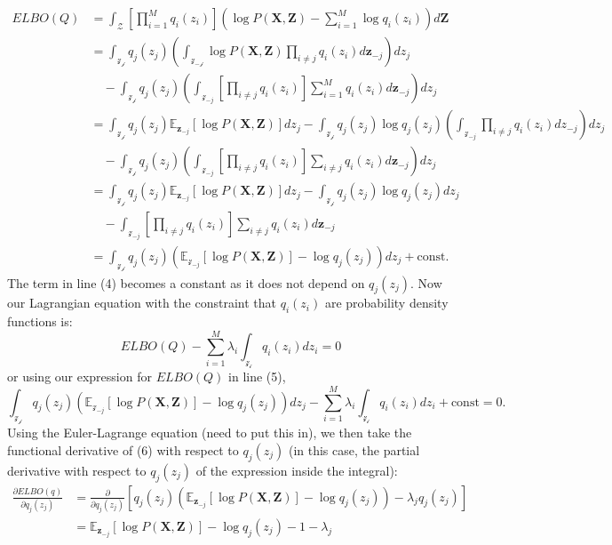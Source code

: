 \documentclass[a4paper,12pt]{article}
\numberwithin{equation}{section}
\begin{document}
\begin{align}
ELBO(Q)&= \int_\mathcal{Z}\left[\prod^M_{i=1}q_i(z_i)\right]\left(\log P(\textbf{X},\textbf{Z})-\sum_{i=1}^M\log q_i(z_i)\right)d\textbf{Z}\nonumber\\
&= \int_\mathcal{z_j}q_j(z_j)\left(\int_\mathcal{z_{-j}}\log P(\textbf{X},\textbf{Z})\prod_{i\neq j}q_i(z_i)d\textbf{z}_{-j} \right) dz_j\nonumber\\
&\quad -\int_{\mathcal{z_j}}q_j(z_j)\left(\int_{\mathcal{z}_{-j}}\left[\prod_{i\neq j}q_i(z_i)\right]\sum_{i=1}^M q_i(z_i)d\textbf{z}_{-j}\right)dz_j\nonumber\\
&= \int_{\mathcal{z_j}}q_j(z_j)\mathbb{E}_{\textbf{z}_{-j}}[\log P(\textbf{X},\textbf{Z})]dz_j-\int_{\mathcal{z_j}}q_j(z_j)\log q_j(z_j)\left(\int_{\mathcal{z}_{-j}}\prod_{i\neq j}q_i(z_i)dz_{-j}\right) dz_j\nonumber\\
&\quad -\int_{\mathcal{z_j}}q_j(z_j)\left(\int_{\mathcal{z}_{-j}}\left[\prod_{i\neq j}q_i(z_i)\right]\sum_{i\neq j}q_i(z_i)d{\textbf{z}_{-j}}\right)dz_j\nonumber\\
&= \int_\mathcal{z_j}q_j(z_j)\mathbb{E}_{\textbf{z}_{-j}}[\log P(\textbf{X},\textbf{Z})]dz_j-\int_\mathcal{z_j}q_j(z_j)\log q_j(z_j)dz_j\nonumber\\
&\quad -\int_{\mathcal{z}_{-j}}\left[\prod_{i\neq j}q_i(z_i)\right]\sum_{i\neq j}q_i(z_i)d{\textbf{z}_{-j}}
\\&= \int_\mathcal{z_j}q_j(z_j)\left(\mathbb{E}_{\mathcal{z}_{-j}}[\log P(\textbf{X},\textbf{Z})]-\log q_j(z_j)\right)dz_j+\text{const}.
\end{align}
The term in line (4) becomes a constant as it does not depend on $q_j(z_j)$. Now our Lagrangian equation with the constraint that $q_i(z_i)$ are probability density functions is:
\begin{equation*}
ELBO(Q)-\sum^M_{i=1}\lambda_i\int_\mathcal{z_i}q_i(z_i)dz_i=0
\end{equation*}
or using our expression for $ELBO(Q)$ in line (5),
\begin{equation}
\int_\mathcal{z_j}q_j(z_j)\left(\mathbb{E}_{\mathcal{z}_{-j}}[\log P(\textbf{X},\textbf{Z})]-\log q_j(z_j)\right)dz_j-\sum^M_{i=1}\lambda_i\int_\mathcal{z_i}q_i(z_i)dz_i+\text{const}=0.
\end{equation}
Using the Euler-Lagrange equation (need to put this in), we then take the functional derivative of (6) with respect to $q_j(z_j)$ (in this case, the partial derivative with respect to $q_j(z_j)$ of the expression inside the integral):
\begin{align}
\frac{\partial ELBO(q)}{\partial q_j(z_j)}&= \frac{\partial}{\partial q_j(z_j)}\left[q_j(z_j)\left(\mathbb{E}_{\textbf{z}_{-j}}[\log P(\textbf{X},\textbf{Z})]-\log q_j(z_j)\right)-\lambda_jq_j(z_j)\right]\nonumber
\\&= \mathbb{E}_{\textbf{z}_{-j}}[\log P(\textbf{X},\textbf{Z})]-\log q_j(z_j)-1-\lambda_j
\end{align}
\end{document}
